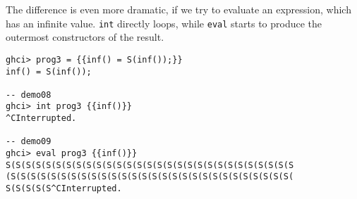The difference is even more dramatic, if we try to evaluate an expression, which has an infinite value.
\texttt{int} directly loops, while \texttt{eval} starts to produce the outermost constructors
of the result.
\begin{lstlisting}[style=demo]
ghci> prog3 = {{inf() = S(inf());}}
inf() = S(inf());

-- demo08
ghci> int prog3 {{inf()}}
^CInterrupted.

-- demo09
ghci> eval prog3 {{inf()}}
S(S(S(S(S(S(S(S(S(S(S(S(S(S(S(S(S(S(S(S(S(S(S(S(S(S(S(S(S
(S(S(S(S(S(S(S(S(S(S(S(S(S(S(S(S(S(S(S(S(S(S(S(S(S(S(S(S(
S(S(S(S(S^CInterrupted.
\end{lstlisting}
